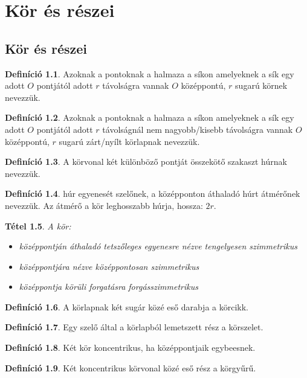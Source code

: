 \documentclass[twoside,12pt]{report}
\newtheorem{theorem}{Tétel}[section]
\theoremstyle{definition}
\newtheorem{definition}[theorem]{Definíció}
\begin{document}
\chapter{Kör és részei}
\section{Kör és részei}
	\begin{definition}
		Azoknak a pontoknak a halmaza a síkon amelyeknek a sík egy adott $O$ pontjától adott
		$r$ távolságra vannak $O$ középpontú, $r$ sugarú körnek nevezzük.
	\end{definition}
	\begin{definition}
		Azoknak a pontoknak a halmaza a síkon amelyeknek a sík egy adott $O$ pontjától adott
		$r$ távolságnál nem nagyobb/kisebb távolságra vannak $O$ középpontú, $r$ sugarú zárt/nyílt körlapnak nevezzük.
	\end{definition}
	\begin{definition}
		A körvonal két különböző pontját összekötő szakaszt húrnak nevezzük.
	\end{definition}
	\begin{definition}
		húr egyenesét szelőnek, a középponton áthaladó húrt átmérőnek nevezzük. Az átmérő
		a kör leghosszabb húrja, hossza: $2r$.
	\end{definition}
	\begin{theorem}
		A kör:
		\begin{itemize}
			\item középpontján áthaladó tetszőleges egyenesre nézve tengelyesen szimmetrikus
			\item középpontjára nézve középpontosan szimmetrikus
			\item középpontja körüli forgatásra forgásszimmetrikus
		\end{itemize}
	\end{theorem}
	\begin{definition}
		A körlapnak két sugár közé eső darabja a körcikk.
	\end{definition}
	\begin{definition}
		Egy szelő által a körlapból lemetszett rész a körszelet.
	\end{definition}
	\begin{definition}
		Két kör koncentrikus, ha középpontjaik egybeesnek.
	\end{definition}
	\begin{definition}
		Két koncentrikus körvonal közé eső rész a körgyűrű.
	\end{definition}
\end{document}
